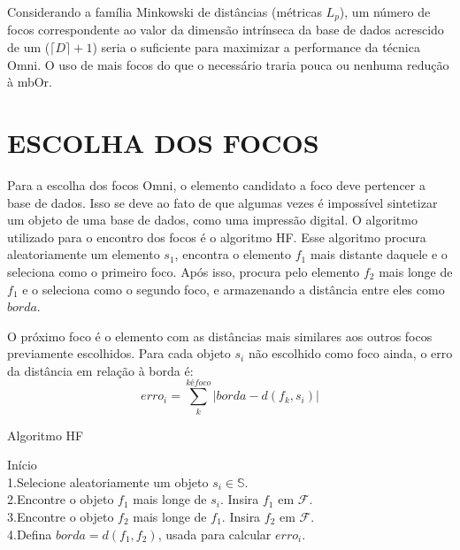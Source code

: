 Considerando a família Minkowski de distâncias (métricas $L_p$), um número de focos correspondente ao valor da
dimensão intrínseca da base de dados acrescido de um ($\lceil D \rceil +1$) seria o suficiente para maximizar a performance da técnica Omni. O uso de mais focos do que o 
necessário traria pouca ou nenhuma redução à mbOr.

\section{ESCOLHA DOS FOCOS}
\label{sec:escoco}
Para a escolha dos focos Omni, o elemento candidato a foco deve pertencer a base de dados. Isso se deve ao fato de que algumas vezes
é impossível sintetizar um objeto de uma base de dados, como uma impressão digital. O algoritmo utilizado para o encontro dos focos
é o algoritmo HF. Esse algoritmo procura aleatoriamente um elemento $s_1$, encontra o elemento $f_1$ mais distante daquele e o seleciona como
o primeiro foco. Após isso, procura pelo elemento $f_2$ mais longe de $f_1$ e o seleciona como o segundo foco, e armazenando
a distância entre eles como $borda$.\par

O próximo foco é o elemento com as distâncias mais similares aos outros focos previamente escolhidos. Para cada objeto
$s_i$ não escolhido como foco ainda, o erro da distância em relação à borda é:
\begin{equation}
 erro_i = \sum_{k}^{k é foco} |borda - d(f_k, s_i)|
\end{equation}

\begin{algorithm}
\label{alg:hf}
    \caption{Algoritmo HF}
    Início\\
       1.Selecione aleatoriamente um objeto $s_i \in \mathbb{S}$.\\
       2.Encontre o objeto $f_1$ mais longe de $s_i$. Insira $f_1$ em $\mathscr{F}$.\\
       3.Encontre o objeto $f_2$ mais longe de $f_1$. Insira $f_2$ em $\mathscr{F}$.\\
       4.Defina $borda=d(f_1,f_2)$, usada para calcular $erro_i$.\\
\end{algorithm}

